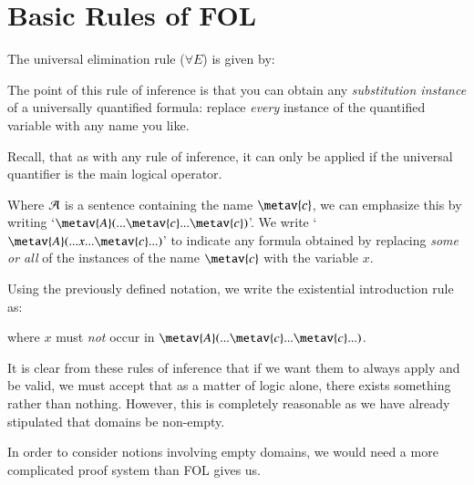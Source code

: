 \documentclass[12pt, a4paper, oneside, openright, titlepage]{book}
\begin{document}
\section{\textsection Basic Rules of FOL}

\begin{defn}
    The universal elimination rule ($\forall E$) is given by:
    \begin{fitchproof}
         
    \end{fitchproof}
\end{defn}

The point of this rule of inference is that you can obtain any \emph{substitution instance} of a universally quantified formula: replace \emph{every} instance of the quantified variable with any name you like.

Recall, that as with any rule of inference, it can only be applied if the universal quantifier is the main logical operator.

\begin{defn}
    Where $\mathcal{A}$ is a sentence containing the name $\metav{c}$, we can emphasize this by writing `$\metav{A}(...\metav{c}...\metav{c})$'. We write `$\metav{A}(...x...\metav{c}...)$' to indicate any formula obtained by replacing \emph{some or all} of the instances of the name $\metav{c}$ with the variable $x$.
\end{defn}

\begin{defn}
    Using the previously defined notation, we write the existential introduction rule as: 
    \begin{fitchproof}
         
    \end{fitchproof}
    where $x$ must \emph{not} occur in $\metav{A}(...\metav{c}...\metav{c}...)$.
\end{defn}

\begin{rmk}
    It is clear from these rules of inference that if we want them to always apply and be valid, we must accept that as a matter of logic alone, there exists something rather than nothing. However, this is completely reasonable as we have already stipulated that domains be non-empty.

    In order to consider notions involving empty domains, we would need a more complicated proof system than FOL gives us.
\end{rmk}
\end{document}

